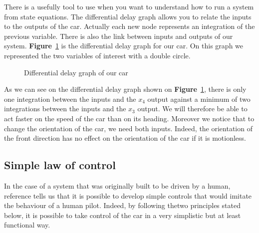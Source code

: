 There is a usefully tool to use when you want to understand
how to run a system from state equations. The differential delay
graph allows you to relate the inputs to the outputs of the car.
Actually each new node represents an integration of the previous variable. There is also the link between
inputs and outputs of our system. \textbf{Figure}~\ref{fig:diff_delay}
is the differential delay graph for our car. On this graph we represented
the two variables of interest with a double circle.

\begin{figure}[!ht]
    \centering
    \caption{Differential delay graph of our car}
    \label{fig:diff_delay}
\end{figure}

As we can see on the differential delay graph shown on \textbf{Figure}~\ref{fig:diff_delay},
there is only one integration between the inputs and the $x_4$ output against a
minimum of two integrations between the inputs and the $x_3$ output. We will therefore
be able to act faster on the speed of the car than on its heading. Moreover we
notice that to change the orientation of the car, we need both inputs. Indeed,
the orientation of the front direction has no effect on the orientation of the
car if it is motionless.

\subsection{Simple law of control}

In the case of a system that was originally built to be driven by a human, reference
\cite{robmooc} tells us that it is possible to develop simple controls that would
imitate the behaviour of a human pilot. Indeed, by following thetwo principles stated below,
it is possible to take control of the car in a very simplistic but at least functional way.

